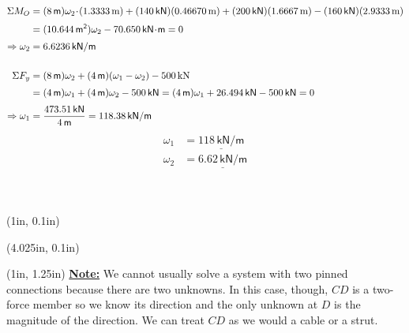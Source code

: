 \documentclass[10pt,oneside]{article}
\def\scale{1}
\begin{document}
\begin{textblock*}{\textwidth}
  \begin{align*}
    \Sigma M_O &= (8\,\textsf{m})\omega_2\!\cdot\!(1.3333\,\text{m}) + (140\,\textsf{kN})(0.46670\,\text{m})+ (200\,\textsf{kN})(1.6667\,\text{m})- (160\,\textsf{kN})(2.9333\,\text{m}) \\[0.25em]
    &= (10.644\,\mathsf{m^2})\omega_2  -70.650\,\mathsf{kN\!\cdot\! m} = 0 \\[0.25em]
    \Rightarrow \omega_2 &= 6.6236\,\textsf{kN/m} \\\\
    \Sigma F_y &= (8\,\textsf{m})\omega_2 +(4\,\textsf{m})(\omega_1-\omega_2) - 500\,\text{kN} \\[0.25em]
    &= (4\,\textsf{m})\omega_1 +(4\,\textsf{m})\omega_2 -500\,\textsf{kN} = (4\,\textsf{m})\omega_1 +26.494\,\textsf{kN} -500\,\textsf{kN} =0 \\[0.25em]
    \Rightarrow \omega_1 &= \frac{473.51\,\textsf{kN}}{4\,\textsf{m}}  = 118.38\,\textsf{kN/m}
  \end{align*}
  \large\centering
      \begin{align*}
        \omega_1 &= \underline{118\,\textsf{kN/m}}\\
        \omega_2 &= \underline{6.62\,\textsf{kN/m}}\\
      \end{align*}
\end{textblock*}


~\newpage
\begin{textblock*}{2.5in}(1in, 0.1in)
\end{textblock*}
\begin{textblock*}{3.75in}(4.025in, 0.1in)
	\cbox{
    \centering
    \def\scale{0.65}
    
  }
\end{textblock*} 

\begin{textblock*}{2.5in}(1in, 1.25in)
	\underline{\bf{Note:}} We cannot usually solve a system with two pinned connections because there are two unknowns. In this case, though, $CD$ is a two-force member so we know its direction and the only unknown at $D$ is the magnitude of the direction. We can treat $CD$ as we would a cable or a strut.
\end{textblock*}
\end{document}
